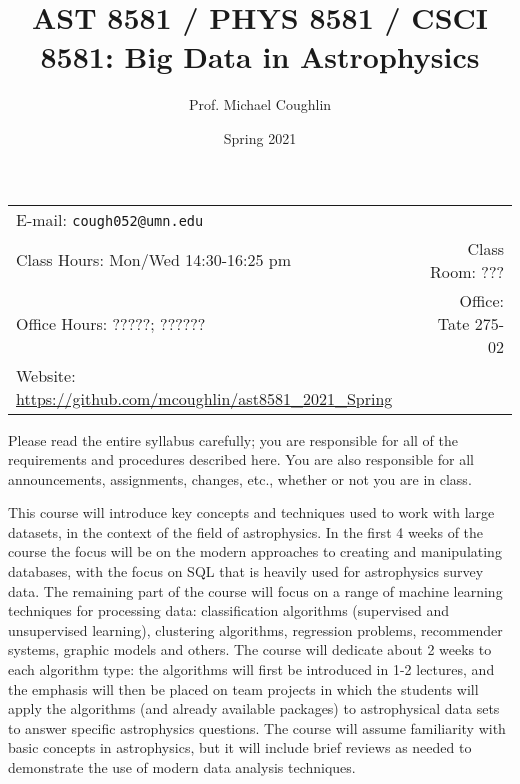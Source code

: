 \documentclass[12pt]{article}
\title{AST 8581 / PHYS 8581 / CSCI 8581: Big Data in Astrophysics}
\author{Prof. Michael Coughlin}
\date{Spring 2021}
\newcommand{\blankline}{\quad\pagebreak[2]}
\begin{document}
\maketitle

\blankline



\begin{tabular*}{.90\textwidth}{lr}  %


E-mail: \texttt{cough052@umn.edu} & \\ 
 Class Hours: Mon/Wed 14:30-16:25 pm & Class Room: ??? \\
 Office Hours: ?????; ?????? &  Office: Tate 275-02 \\
 Website: \url{https://github.com/mcoughlin/ast8581_2021_Spring}

&  \\
\hline
\end{tabular*}

\vspace{5 mm}

\setlength{\parindent}{2em}
\setlength{\parskip}{0.6em}
\renewcommand{\baselinestretch}{1.2}


Please read the entire syllabus carefully; you are responsible for all of the requirements and procedures described here. You are also responsible for all announcements, assignments, changes, etc., whether or not you are in class. 

This course will introduce key concepts and techniques used to work with large datasets, in the
context of the field of astrophysics. In the first 4 weeks of the course the focus will be on the modern approaches to creating and manipulating databases, with the focus on SQL that is heavily used for astrophysics survey data. The remaining part of the course will focus on a range of machine learning techniques for processing data: classification algorithms (supervised and unsupervised learning), clustering algorithms, regression problems, recommender systems, graphic models and others. The course will dedicate about 2 weeks to each algorithm type: the algorithms will first be introduced in 1-2 lectures, and the emphasis will then be placed on team projects in which the students will apply the algorithms (and already available packages) to astrophysical data sets to answer specific astrophysics questions. The course will assume familiarity with basic concepts in astrophysics, but it will include brief reviews as needed to demonstrate the use of modern data analysis techniques.
\end{document}
